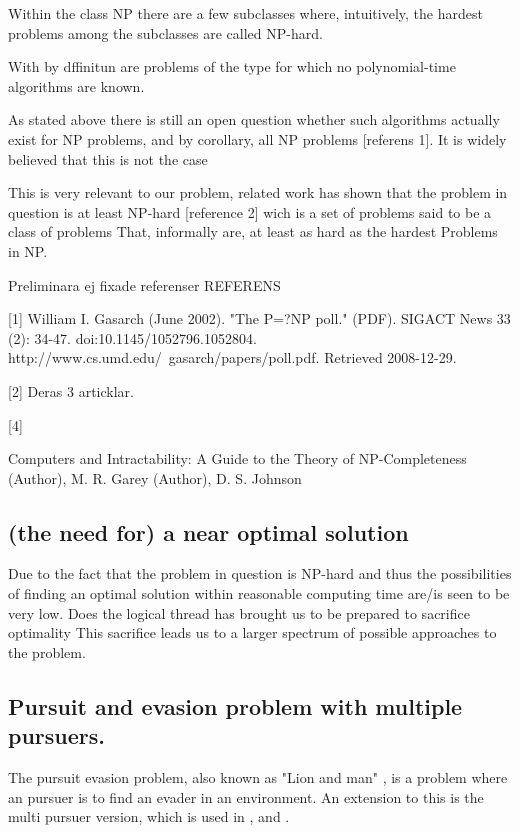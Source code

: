 Within the class NP there are a few subclasses where, intuitively, the hardest problems among the subclasses are called NP-hard.

With by dffinitun are problems of the type for which no polynomial-time algorithms are known. 

As stated above there is still an open question whether such algorithms actually exist for NP problems, and by corollary, all NP problems [referens 1]. It is widely believed that this is not the case 

This is very relevant to our problem, related work has shown that the problem in question is at least NP-hard [reference 2] wich is a set of problems said to be a class of problems That, informally are, at least as hard as the hardest Problems in NP.




Preliminara ej fixade referenser 
REFERENS 

[1]
William I. Gasarch (June 2002). "The P=?NP poll." (PDF). SIGACT News 33 (2): 34-47. doi:10.1145/1052796.1052804. http://www.cs.umd.edu/~gasarch/papers/poll.pdf. Retrieved 2008-12-29.

[2] 
Deras 3 articklar.


[4]

Computers and Intractability: A Guide to the Theory of NP-Completeness  (Author),  M. R. Garey (Author), D. S. Johnson


\subsection{(the need for) a near optimal solution}

Due to the fact that the problem in question is NP-hard and thus the possibilities of finding an optimal solution within reasonable computing time are/is seen to be very low. Does the logical thread has brought us to be prepared to sacrifice optimality
This sacrifice leads us to a larger spectrum of possible approaches to the problem.

 \subsection {Pursuit and evasion problem with multiple pursuers.}
The pursuit evasion problem, also known as "Lion and man" \cite{Dumitrescu08}, is a problem where an pursuer is to find an evader in an environment. An extension to this is the multi pursuer version, which is used in \cite{paper1},\cite{paper2} and \cite{paper3}.


